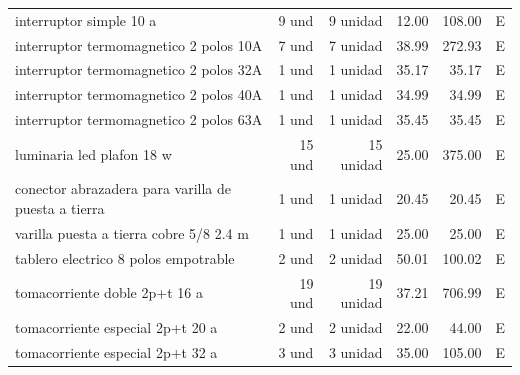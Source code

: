 \begin{landscape}
\begin{longtable}{p{8.0cm}r r r r c}
interruptor simple 10 a & 9 und & 9 unidad & 12.00 & 108.00 & E \\
interruptor termomagnetico 2 polos 10A & 7 und & 7 unidad & 38.99 & 272.93 & E \\
interruptor termomagnetico 2 polos 32A & 1 und & 1 unidad & 35.17 & 35.17 & E \\
interruptor termomagnetico 2 polos 40A & 1 und & 1 unidad & 34.99 & 34.99 & E \\
interruptor termomagnetico 2 polos 63A & 1 und & 1 unidad & 35.45 & 35.45 & E \\
luminaria led plafon 18 w & 15 und & 15 unidad & 25.00 & 375.00 & E \\
conector abrazadera para varilla de puesta a tierra & 1 und & 1 unidad & 20.45 & 20.45 & E \\
varilla puesta a tierra cobre 5/8 2.4 m & 1 und & 1 unidad & 25.00 & 25.00 & E \\
tablero electrico 8 polos empotrable & 2 und & 2 unidad & 50.01 & 100.02 & E \\
tomacorriente doble 2p+t 16 a & 19 und & 19 unidad & 37.21 & 706.99 & E \\
tomacorriente especial 2p+t 20 a & 2 und & 2 unidad & 22.00 & 44.00 & E \\
tomacorriente especial 2p+t 32 a & 3 und & 3 unidad & 35.00 & 105.00 & E \\
\bottomrule\end{longtable}\normalsize\end{landscape}
